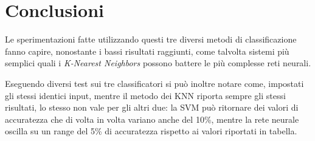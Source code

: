 \documentclass[11pt, a4paper, titlepage]{article}
\begin{document}
\section{Conclusioni}
Le sperimentazioni fatte utilizzando questi tre diversi metodi di classificazione fanno capire, nonostante i bassi risultati raggiunti, come talvolta sistemi più semplici quali i \emph{K-Nearest Neighbors} possono battere le più complesse reti neurali. 

Eseguendo diversi test sui tre classificatori si può inoltre notare come, impostati gli stessi identici input, mentre il metodo dei KNN riporta sempre gli stessi risultati, lo stesso non vale per gli altri due: la SVM può ritornare dei valori di accuratezza che di volta in volta variano anche del 10\%, mentre la rete neurale oscilla su un range del 5\% di accuratezza rispetto ai valori riportati in tabella.


\pagebreak
{}

\end{document}
